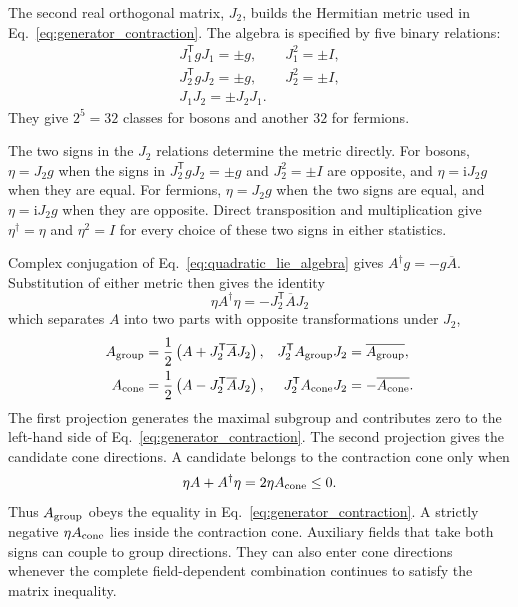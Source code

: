\documentclass[onecolumn,aps,prb,amsmath,amssymb,superscriptaddress,longbibliography,floatfix]{revtex4-2}
\newcommand{\ii}{\mathrm{i}}
\newcommand{\trans}{\mathsf{T}}
\begin{document}
The second real orthogonal matrix, \(J_2\), builds the Hermitian metric used in Eq.~\eqref{eq:generator_contraction}.  The algebra is specified by five binary relations:
\begin{equation}
\begin{gathered}
    J_1^\trans gJ_1=\pm g,\qquad J_1^2=\pm I,\\
    J_2^\trans gJ_2=\pm g,\qquad J_2^2=\pm I,\\
    J_1J_2=\pm J_2J_1.
\end{gathered}
    \label{eq:five_relations}
\end{equation}
They give \(2^5=32\) classes for bosons and another \(32\) for fermions.

The two signs in the \(J_2\) relations determine the metric directly.  For bosons, \(\eta=J_2g\) when the signs in \(J_2^\trans gJ_2=\pm g\) and \(J_2^2=\pm I\) are opposite, and \(\eta=\ii J_2g\) when they are equal.  For fermions, \(\eta=J_2g\) when the two signs are equal, and \(\eta=\ii J_2g\) when they are opposite.  Direct transposition and multiplication give \(\eta^\dagger=\eta\) and \(\eta^2=I\) for every choice of these two signs in either statistics.

Complex conjugation of Eq.~\eqref{eq:quadratic_lie_algebra} gives \(A^\dagger g=-g\overline A\).  Substitution of either metric then gives the identity
\begin{equation}
    \eta A^\dagger\eta=-J_2^\trans\overline A J_2
    \label{eq:eta_J2_identity}
\end{equation}
which separates \(A\) into two parts with opposite transformations under \(J_2\),
\begin{align}
    A_{\rm group}
      &=\frac12\left(A+J_2^\trans\overline A J_2\right),
    &J_2^\trans A_{\rm group}J_2&=\overline{A_{\rm group}},
    \label{eq:A_group_projection}\\
    A_{\rm cone}
      &=\frac12\left(A-J_2^\trans\overline A J_2\right),
    &J_2^\trans A_{\rm cone}J_2&=-\overline{A_{\rm cone}}.
    \label{eq:A_cone_projection}
\end{align}
The first projection generates the maximal subgroup and contributes zero to the left-hand side of Eq.~\eqref{eq:generator_contraction}.  The second projection gives the candidate cone directions.  A candidate belongs to the contraction cone only when
\begin{equation}
    \eta A+A^\dagger\eta=2\eta A_{\rm cone}\leq0.
    \label{eq:cone_condition}
\end{equation}
Thus \(A_{\rm group}\) obeys the equality in Eq.~\eqref{eq:generator_contraction}.  A strictly negative \(\eta A_{\rm cone}\) lies inside the contraction cone.  Auxiliary fields that take both signs can couple to group directions.  They can also enter cone directions whenever the complete field-dependent combination continues to satisfy the matrix inequality.
\end{document}
